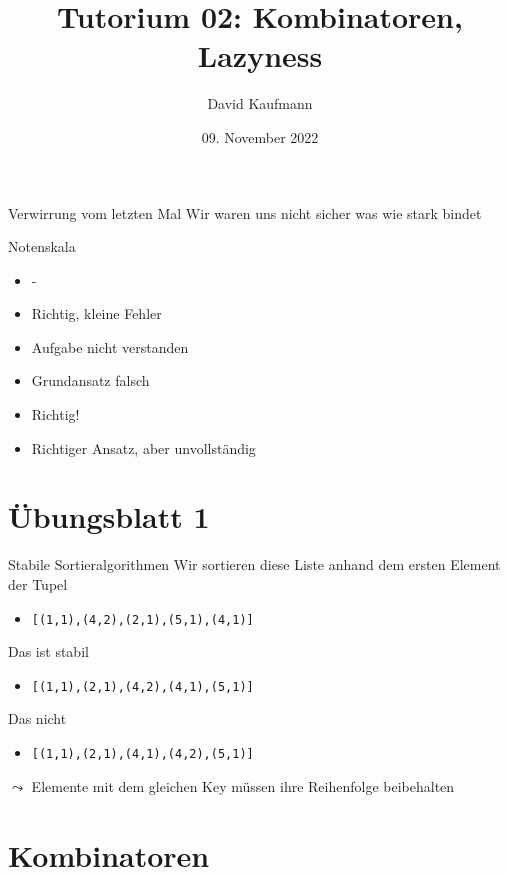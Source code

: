 \documentclass{beamer}
\title{Tutorium 02: Kombinatoren, Lazyness}
\author{David Kaufmann}
\institute{Tutorium Programmierparadigmen am KIT}
\date{09. November 2022}
\begin{document}
\begin{frame}
	\titlepage
\end{frame}

\begin{frame}{Verwirrung vom letzten Mal}
    Wir waren uns nicht sicher was wie stark bindet
\end{frame}

\begin{frame}{Notenskala}
	\begin{itemize}
		\item -
		\item Richtig, kleine Fehler
		\item Aufgabe nicht verstanden
		\item Grundansatz falsch
		\item Richtig!
		\item Richtiger Ansatz, aber unvollständig
	\end{itemize}
\end{frame}

\section{Übungsblatt 1}

\begin{frame}{Stabile Sortieralgorithmen}
    Wir sortieren diese Liste anhand dem ersten Element der Tupel
    \begin{itemize}
        \item \texttt{[(1,1),(4,2),(2,1),(5,1),(4,1)]}
    \end{itemize}
    Das ist stabil
    \begin{itemize}
        \item \texttt{[(1,1),(2,1),(4,2),(4,1),(5,1)]}
    \end{itemize}
    Das nicht 
    \begin{itemize}
        \item \texttt{[(1,1),(2,1),(4,1),(4,2),(5,1)]}
    \end{itemize}
    $\leadsto$ Elemente mit dem gleichen Key müssen ihre Reihenfolge beibehalten
\end{frame}

\section{Kombinatoren}
\end{document}
